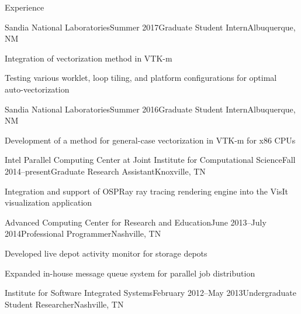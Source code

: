 \documentclass{resume} %
\begin{document}
\begin{rSection}{Experience}

\begin{rSubsection}{Sandia National Laboratories}{Summer 2017}{Graduate Student Intern}{Albuquerque, NM}
    \item Integration of vectorization method in VTK-m
    \item Testing various worklet, loop tiling, and platform configurations for optimal \\ auto-vectorization
\end{rSubsection}

\begin{rSubsection}{Sandia National Laboratories}{Summer 2016}{Graduate Student Intern}{Albuquerque, NM}
    \item Development of a method for general-case vectorization in VTK-m for x86 CPUs
\end{rSubsection}


\begin{rSubsection}{Intel Parallel Computing Center at Joint Institute for Computational Science}{Fall 2014--present}{Graduate Research Assistant}{Knoxville, TN}
    \item Integration and support of OSPRay ray tracing rendering engine into the VisIt \\ visualization application
\end{rSubsection}


\begin{rSubsection}{Advanced Computing Center for Research and Education}{June 2013--July 2014}{Professional Programmer}{Nashville, TN}
\item Developed live depot activity monitor for storage depots
\item Expanded in-house message queue system for parallel job distribution
\end{rSubsection}


\begin{rSubsection}{Institute for Software Integrated Systems}{February 2012--May 2013}{Undergraduate Student Researcher}{Nashville, TN}
\end{rSubsection}


\end{rSection}
\end{document}
